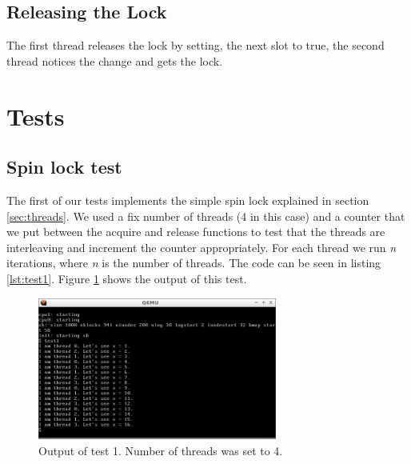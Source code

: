 \documentclass[10pt]{scrartcl}
\begin{document}

\subsection{Releasing the Lock}
The first thread releases the lock by setting, the next slot to true, the second thread notices the change and gets the lock.


\section{Tests}
\subsection{Spin lock test}
The first of our tests implements the simple spin lock explained in section \ref{sec:threads}.  We used a fix number of threads (4 in this case) and a counter that we put between the acquire and release functions to test that the threads are interleaving and increment the counter appropriately. For each thread we run \textit{n} iterations, where \textit{n} is the number of threads. The code can be seen in listing \ref{lst:test1}.  Figure \ref{fig:test1} shows the output of this test.


\begin{figure}
  \centering
  \includegraphics[width=0.7\textwidth]{figures/test1.png}
  \caption{Output of test 1.  Number of threads was set to 4.}\label{fig:test1}
\end{figure}
\end{document}
